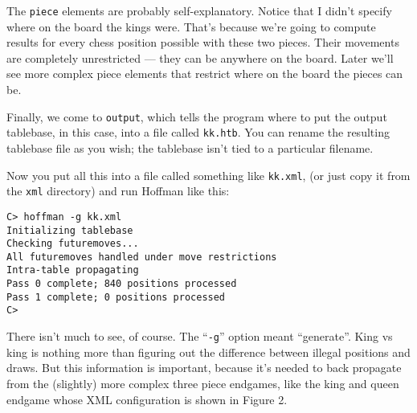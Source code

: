 \documentclass[11pt]{article}
\begin{document}


The {\tt piece} elements are probably self-explanatory.  Notice that I
 didn't specify where on the board the kings were.  That's because
 we're going to compute results for every chess position possible with
 these two pieces.  Their movements are completely unrestricted ---
 they can be anywhere on the board.  Later we'll see more complex
 piece elements that restrict where on the board the pieces can be.

Finally, we come to {\tt output}, which tells the program where to put
 the output tablebase, in this case, into a file called {\tt kk.htb}.
  You can rename the resulting tablebase file as you wish; the
 tablebase isn't tied to a particular filename.

Now you put all this into a file called something like {\tt kk.xml},
(or just copy it from the {\tt xml} directory) and run Hoffman
like this:


\begin{verbatim}
C> hoffman -g kk.xml
Initializing tablebase
Checking futuremoves...
All futuremoves handled under move restrictions
Intra-table propagating
Pass 0 complete; 840 positions processed
Pass 1 complete; 0 positions processed
C>
\end{verbatim}

There isn't much to see, of course.  The ``{\tt -g}'' option
meant ``generate''.  King vs king is nothing more than figuring out
the difference between illegal positions and draws.  But this
information is important, because it's needed to back propagate from
the (slightly) more complex three piece endgames, like the king and
queen endgame whose XML configuration is shown in Figure 2.
\end{document}
